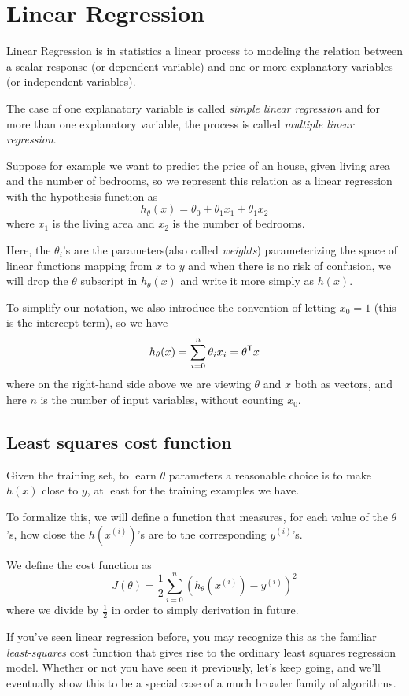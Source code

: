 \chapter{Linear Regression}
Linear Regression is in statistics a linear process to modeling the relation between
a scalar response (or dependent variable) and one or more explanatory variables (or independent variables).

The case of one explanatory variable is called \emph{simple linear regression} and 
for more than one explanatory variable, the process is called \emph{multiple linear regression}.

Suppose for example we want to predict the price of an house, given living area and the number of bedrooms,
so we represent this relation as a linear regression with the hypothesis function as 
\[ h_{\theta}(x) = \theta_0 + \theta_1 x_1 + \theta_1 x_2 \]
where $x_1$ is the living area and $x_2$ is the number of bedrooms.

Here, the $\theta_i$’s are the parameters(also called \emph{weights}) parameterizing the 
space of linear functions mapping from $x$ to $y$ and when there is no risk of confusion,
we will drop the $\theta$ subscript in $h_{\theta}(x)$ and write it more simply as $h(x)$.

To simplify our notation, we also introduce the convention of letting $x_0 = 1$
(this is the intercept term), so we have 
\[ h_{\theta}(x) = \sum _{i = 0} ^n \theta_i x_i = \theta ^ \mathsf{T} x \]
where on the right-hand side above we are viewing $\theta$ and $x$ both as vectors, 
and here $n$ is the number of input variables, without counting $x_0$.

\section{Least squares cost function}
Given the training set, to learn $\theta$ parameters a reasonable choice is to make
$h(x)$ close to $y$, at least for the training examples we have.

To formalize this, we will define a function that measures, for each value of the $\theta$’s,
how close the $h(x^{(i)})$’s are to the corresponding $y^{(i)}$’s.

We define the cost function as
\[ J(\theta) = \frac{1}{2} \sum _{i=0} ^n \left (h_{\theta}(x^{(i)}) - y^{(i)} \right )^2 \]
where we divide by $\frac{1}{2}$ in order to simply derivation in future.

If you’ve seen linear regression before, you may recognize this as the familiar 
\emph{least-squares} cost function that gives rise to the ordinary least squares regression model.\newline
Whether or not you have seen it previously, let’s keep going, and we’ll eventually show this to be
a special case of a much broader family of algorithms.

